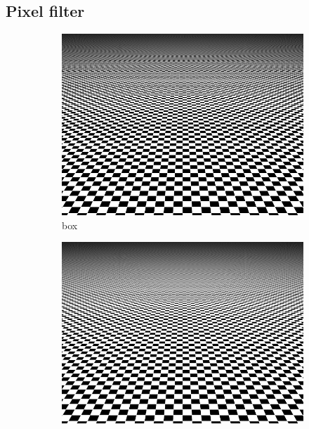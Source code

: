 \subsection{Pixel filter}
\label{sec:pixel_filter}

\begin{figure}
    \centering
    \begin{subfigure}[t]{0.32\linewidth}
        \centering
        \includegraphics[width=\textwidth]{imgs/box.png}
        \caption{box}
        \label{fig:box_filter}
    \end{subfigure}
    \begin{subfigure}[t]{0.32\linewidth}
        \centering
        \includegraphics[width=\textwidth]{imgs/tent.png}

\end{subfigure}
\end{figure}
